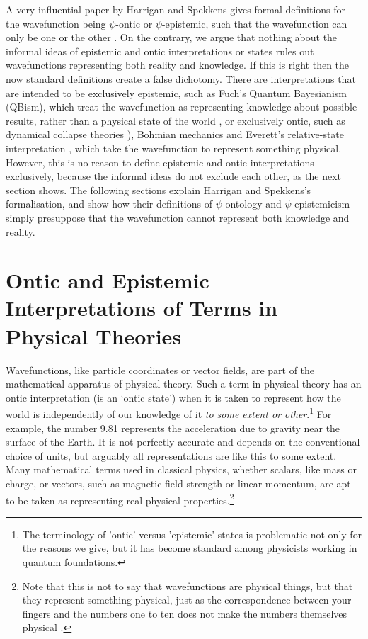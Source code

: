 \documentclass[superscriptaddress,reprint, floatfix, prl,nofootinbib]{revtex4-2}
\begin{document}
A very influential paper by Harrigan and Spekkens gives formal definitions for the wavefunction being $\psi$-ontic or $\psi$-epistemic, such that the wavefunction can only be one or the other \cite{Harrigan2010Nonlocality}. On the contrary, we argue that nothing about the informal ideas of epistemic and ontic interpretations or states rules out wavefunctions representing both reality and knowledge. If this is right then the now standard definitions create a false dichotomy. There are interpretations that are intended to be exclusively epistemic, such as Fuch's Quantum Bayesianism (QBism), which treat the wavefunction as representing knowledge about possible results, rather than a physical state of the world \cite{Fuchs2002Info,Fuchs2014QBism}, or exclusively ontic, such as dynamical collapse theories \cite{Penrose1996Gravity}\cite{Ghirardi1986Unified}), Bohmian mechanics \cite{Bohm1952Suggested} and Everett's relative-state interpretation \cite{Everett1957Relative}, which take the wavefunction to represent something physical. However, this is no reason to define epistemic and ontic interpretations exclusively, because the informal ideas do not exclude each other, as the next section shows. The following sections explain Harrigan and Spekkens's formalisation, and show how their definitions of $\psi$-ontology and $\psi$-epistemicism simply presuppose that the wavefunction cannot represent both knowledge and reality.

\section{Ontic and Epistemic Interpretations of Terms in Physical Theories}

Wavefunctions, like particle coordinates or vector fields, are part of the mathematical apparatus of physical theory. Such a term in physical theory has an ontic interpretation (is an `ontic state') when it is taken to represent how the world is independently of our knowledge of it \emph{to some extent or other}.\footnote{The terminology of 'ontic' versus 'epistemic' states is problematic not only for the reasons we give, but it has become standard among physicists working in quantum foundations.} For example, the number 9.81 represents the acceleration due to gravity near the surface of the Earth. It is not perfectly accurate and depends on the conventional choice of units, but arguably all representations are like this to some extent. Many mathematical terms used in classical physics, whether scalars, like mass or charge, or vectors, such as magnetic field strength or linear momentum, are apt to be taken as representing real physical properties.\footnote{Note that this is not to say that wavefunctions are physical things, but that they represent something physical, just as the correspondence between your fingers and the numbers one to ten does not make the numbers themselves physical \cite{Wallace2010StateRealism,Schlosshauer2012Implications,Hermens2021Howreal}.}
\end{document}
